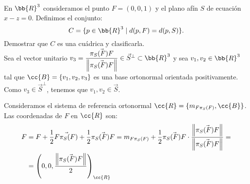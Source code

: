 \begin{ejercicio}
    En $\bb{R}^3$ consideramos el punto $F = (0, 0, 1)$ y el plano afín $S$ de ecuación $x-z = 0$. Definimos el conjunto:
    \begin{equation*}
        C = \{p \in \bb{R}^3 \mid d(p, F) = d(p, S)\}.
    \end{equation*}
    Demostrar que $C$ es una cuádrica y clasificarla.\\


    Sea el vector unitario $v_3=\dfrac{\vec{\pi_S(F)F}}{\left\|\vec{\pi_S(F)F}\right\|}\in \vec{S}^\perp \subset \bb{R}^3$
    y sea $v_1,v_2\in \bb{R}^3$ tal que $\cc{B}=\{v_1,v_2,v_3\}$ es una base ortonormal orientada positivamente.
    Como $v_3\in \vec{S}^\perp$, tenemos que $v_1,v_2\in \vec{S}$.

    Consideramos el sistema de referencia ortonormal $\cc{R}=\{m_{F\pi_S(F)},\cc{B}\}$. Las coordenadas de $F$ en $\cc{R}$ son:
    \begin{align*}
        F &= F + \frac{1}{2}\vec{F\pi_S(F)} + \frac{1}{2}\vec{\pi_S(F)F} 
        = m_{F \pi_S(F)} + \frac{1}{2}\vec{\pi_S(F)F} \cdot \dfrac{\left\|\vec{\pi_S(F)F}\right\|}{\left\|\vec{\pi_S(F)F}\right\|}
        =\\&= \left(0,0, \dfrac{\left\|\vec{\pi_S(F)F}\right\|}{2}\right)_{\cc{R}}
    \end{align*}


\end{ejercicio}
